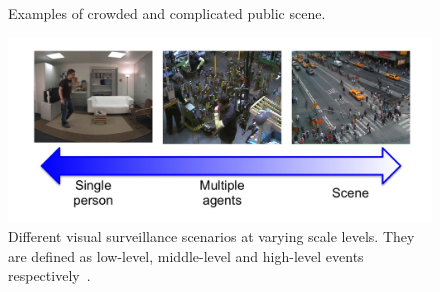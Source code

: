 \begin{figure}[!htbp]
	\centering
	\caption[Examples of crowded and complicated public scene]
	{Examples of crowded and complicated public scene.}
	\label{fig:example_scenes}
\end{figure}

\begin{figure}[!htbp]
	\centering
	\includegraphics[width = 1 \textwidth]{figures/event_level.jpg}
	\caption[Different visual surveillance scenarios at varying scale levels]
	{ Different visual surveillance scenarios at varying scale levels. They are defined as low-level, middle-level and high-level events respectively~\cite{nater2012abnormal}.}
	\label{fig:event_level}
\end{figure}

